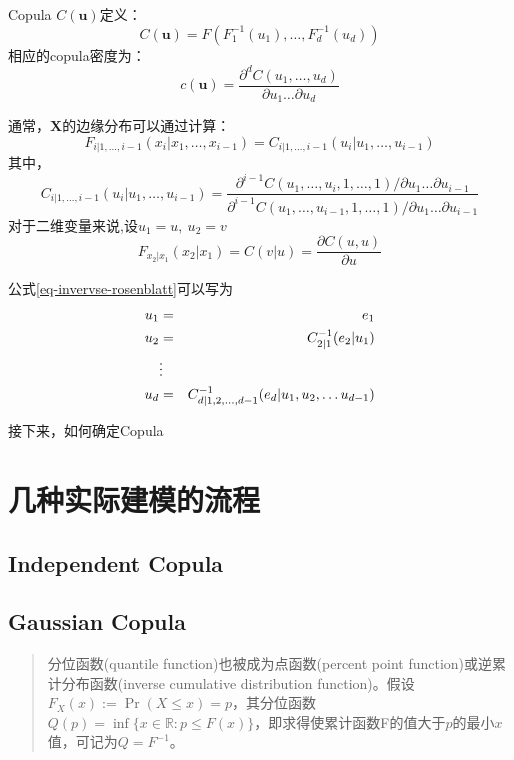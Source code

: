 Copula $C(\mathbf{u})$定义：
\begin{equation}
    \label{eq-cf}
    C(\mathbf{u}) = F(F_1^{-1}(u_1),\dots,F_d^{-1}(u_d))
\end{equation}
相应的copula密度为：
\begin{equation}
    \label{eq-cfd}
    c(\mathbf{u}) = \dfrac{\partial^d C(u_1,\dots,u_d)}{\partial u_1\dots\partial u_d}
\end{equation}

通常，$\mathbf{X}$的边缘分布可以通过计算：
\begin{equation}
    \label{eq-margin}
    F_{i|1,\dots,i-1}(x_i|x_1,\dots,x_{i-1}) = C_{i|1,\dots,i-1}(u_i|u_1,\dots,u_{i-1})
\end{equation}
其中，
\begin{equation}
    \label{eq-margin2}
    C_{i|1,\dots,i-1}(u_i|u_1,\dots,u_{i-1}) = \dfrac{\partial^{i-1}C(u_1,\dots,u_i,1,\dots,1)/\partial u_1\dots\partial u_{i-1}}{\partial^{i-1}C(u_1,\dots,u_{i-1},1,\dots,1)/\partial u_1\dots\partial u_{i-1}} 
\end{equation}
对于二维变量来说,设$u_1 = u,\ u_2 = v$
\begin{equation}
    \label{eq-bivariate}
    F_{x_2|x_1}(x_2|x_1) = C(v|u) = \dfrac{\partial C(u,u)}{\partial u}
\end{equation}

公式\ref{eq-invervse-rosenblatt}可以写为
\begin{eqnarray}
    \label{eq-inverse-transform-using-copula}
    u_1 &=& e_1 \notag \\
    u_2 &=& C_{2|1}^{-1}(e_2|u_1) \notag\\
    &\vdots& \\
    u_d &=& C_{d|1,2,\dots,d-1}^{-1}(e_d|u_1,u_2,\dots u_{d-1}) \notag
\end{eqnarray}

接下来，如何确定Copula


\section{几种实际建模的流程}

\subsection{Independent Copula}
\subsection{Gaussian Copula}
\begin{quotation}
    分位函数(quantile function)也被成为点函数(percent point function)或逆累计分布函数(inverse cumulative distribution function)。假设$F_X(x) := \Pr (X \leq x) = p$，其分位函数$Q(p) = \inf\{x \in \mathbb{R} : p \leq F(x)\}$，即求得使累计函数F的值大于$p$的最小$x$值，可记为$Q = F^{-1}$。
\end{quotation}

